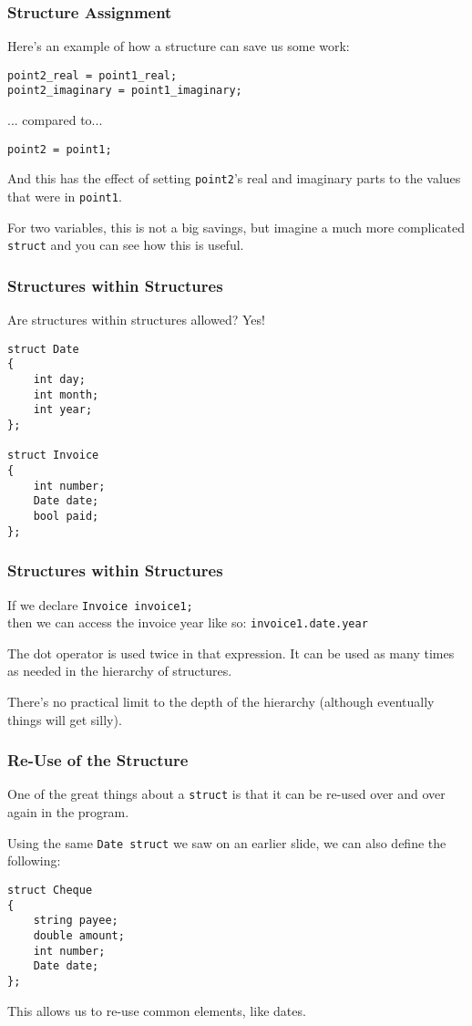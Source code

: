 \begin{frame}[fragile]
\frametitle{Structure Assignment}
Here's an example of how a structure can save us some work:

\begin{verbatim}
point2_real = point1_real;
point2_imaginary = point1_imaginary;
\end{verbatim}

... compared to...

\begin{verbatim}
point2 = point1;
\end{verbatim}

And this has the effect of setting \texttt{point2}'s real and imaginary parts to the values that were in \texttt{point1}.

For two variables, this is not a big savings, but imagine a much more complicated \texttt{struct} and you can see how this is useful.

\texttt{}

\end{frame}

\begin{frame}[fragile]
\frametitle{Structures within Structures}

Are structures within structures allowed? Yes!

\begin{verbatim}
struct Date
{
    int day;
    int month;
    int year;
};

struct Invoice
{
    int number;
    Date date;
    bool paid;
};
\end{verbatim}


\end{frame}

\begin{frame}[fragile]
\frametitle{Structures within Structures}

If we declare \texttt{Invoice invoice1;}\\
\quad then we can access the invoice year like so: \texttt{invoice1.date.year}


The dot operator is used twice in that expression. It can be used as many times as needed in the hierarchy of structures.

There's no practical limit to the depth of the hierarchy (although eventually things will get silly).

\end{frame}

\begin{frame}[fragile]
\frametitle{Re-Use of the Structure}

One of the great things about a \texttt{struct} is that it can be re-used over and over again in the program.

Using the same \texttt{Date struct} we saw on an earlier slide, we can also define the following:

\begin{verbatim}
struct Cheque
{
    string payee;
    double amount;
    int number;
    Date date;
};
\end{verbatim}

This allows us to re-use common elements, like dates.
\end{frame}

